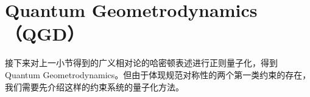 
	\section{Quantum Geometrodynamics（QGD）}\label{section-QGD}

	接下来对上一小节得到的广义相对论的哈密顿表述进行正则量子化，得到 Quantum Geometrodynamics。但由于体现规范对称性的两个第一类约束的存在，我们需要先介绍这样的约束系统的量子化方法。

